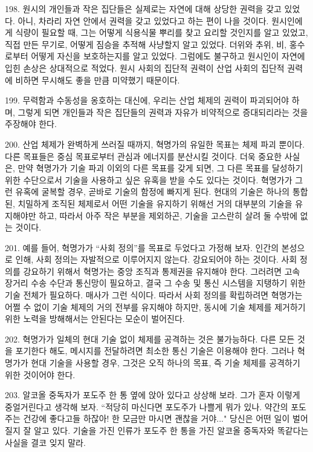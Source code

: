 \documentclass[11pt,a4paper]{article}
\begin{document}
\begin{multicols}{2}
198. 원시의 개인들과 작은 집단들은 실제로는 자연에 대해 상당한 권력을 갖고 있었다. 아니, 차라리  자연 안에서 권력을 갖고 있었다고 하는 편이 나을 것이다. 원시인에게 식량이 필요할 때, 그는 어떻게  식용식물 뿌리를 찾고 요리할 것인지를 알고 있었고, 직접 만든 무기로, 어떻게 짐승을 추적해 사냥할지  알고 있었다. 더위와 추위, 비, 홍수로부터 어떻게 자신을 보호하는지를 알고 있었다. 그럼에도 불구하고  원시인이 자연에 입힌 손상은 상대적으로 적었다. 원시 사회의 집단적 권력이 산업 사회의 집단적 권력에  비하면 무시해도 좋을 만큼 미약했기 때문이다.  


199. 무력함과 수동성을 옹호하는 대신에, 우리는 산업 체제의 권력이 파괴되어야 하며, 그렇게 되면  개인들과 작은 집단들의 권력과 자유가 비약적으로 증대되리라는 것을 주장해야 한다. 


200. 산업 체제가 완벽하게 쓰러질 때까지, 혁명가의 유일한 목표는 체제 파괴 뿐이다. 다른 목표들은  중심 목표로부터 관심과 에너지를 분산시킬 것이다. 더욱 중요한 사실은, 만약 혁명가가 기술 파괴 이외의 다른 목표를 갖게 되면, 그 다른 목표를 달성하기 위한 수단으로서 기술을 사용하고 싶은 유혹을 받을  수도 있다는 것이다. 혁명가가 그런 유혹에 굴복할 경우, 곧바로 기술의 함정에 빠지게 된다. 현대의  기술은 하나의 통합된, 치밀하게 조직된 체제로서 어떤 기술을 유지하기 위해선 거의 대부분의 기술을  유지해야만 하고, 따라서 아주 작은 부분을 제외하곤, 기술을 고스란히 살려 둘 수밖에 없는 것이다.  


201. 예를 들어, 혁명가가 “사회 정의”를 목표로 두었다고 가정해 보자. 인간의 본성으로 인해, 사회  정의는 자발적으로 이루어지지 않는다. 강요되어야 하는 것이다. 사회 정의를 강요하기 위해서 혁명가는  중앙 조직과 통제권을 유지해야 한다. 그러려면 고속 장거리 수송 수단과 통신망이 필요하고, 결국 그  수송 및 통신 시스템을 지탱하기 위한 기술 전체가 필요하다. 매사가 그런 식이다. 따라서 사회 정의를  확립하려면 혁명가는 어쩔 수 없이 기술 체제의 거의 전부를 유지해야 하지만, 동시에 기술 체제를  제거하기 위한 노력을 방해해서는 안된다는 모순이 벌어진다. 


202. 혁명가가 일체의 현대 기술 없이 체제를 공격하는 것은 불가능하다. 다른 모든 것을 포기한다 해도,  메시지를 전달하려면 최소한 통신 기술은 이용해야 한다. 그러나 혁명가가 현대 기술을 사용할 경우,  그것은 오직 하나의 목표, 즉 기술 체제를 공격하기 위한 것이어야 한다.  


203. 알코올 중독자가 포도주 한 통 옆에 앉아 있다고 상상해 보라. 그가 혼자 이렇게 중얼거린다고  생각해 보자. “적당히 마신다면 포도주가 나쁠게 뭐가 있나. 약간의 포도주는 건강에 좋다고들 하잖아! 한 모금만 마시면 괜찮을 거야..." 당신은 어떤 일이 벌어질지 잘 알고 있다. 기술을 가진 인류가 포도주 한  통을 가진 알코올 중독자와 똑같다는 사실을 결코 잊지 말라.  



\end{multicols}
\end{document}
